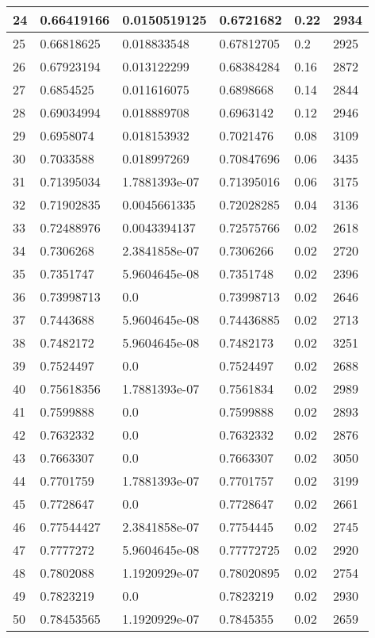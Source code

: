 \begin{longtable}{|l|l|l|l|l|l|}
24 & 0.66419166 & 0.0150519125 & 0.6721682 & 0.22 & 2934 \\ \hline 
25 & 0.66818625 & 0.018833548 & 0.67812705 & 0.2 & 2925 \\ \hline 
26 & 0.67923194 & 0.013122299 & 0.68384284 & 0.16 & 2872 \\ \hline 
27 & 0.6854525 & 0.011616075 & 0.6898668 & 0.14 & 2844 \\ \hline 
28 & 0.69034994 & 0.018889708 & 0.6963142 & 0.12 & 2946 \\ \hline 
29 & 0.6958074 & 0.018153932 & 0.7021476 & 0.08 & 3109 \\ \hline 
30 & 0.7033588 & 0.018997269 & 0.70847696 & 0.06 & 3435 \\ \hline 
31 & 0.71395034 & 1.7881393e-07 & 0.71395016 & 0.06 & 3175 \\ \hline 
32 & 0.71902835 & 0.0045661335 & 0.72028285 & 0.04 & 3136 \\ \hline 
33 & 0.72488976 & 0.0043394137 & 0.72575766 & 0.02 & 2618 \\ \hline 
34 & 0.7306268 & 2.3841858e-07 & 0.7306266 & 0.02 & 2720 \\ \hline 
35 & 0.7351747 & 5.9604645e-08 & 0.7351748 & 0.02 & 2396 \\ \hline 
36 & 0.73998713 & 0.0 & 0.73998713 & 0.02 & 2646 \\ \hline 
37 & 0.7443688 & 5.9604645e-08 & 0.74436885 & 0.02 & 2713 \\ \hline 
38 & 0.7482172 & 5.9604645e-08 & 0.7482173 & 0.02 & 3251 \\ \hline 
39 & 0.7524497 & 0.0 & 0.7524497 & 0.02 & 2688 \\ \hline 
40 & 0.75618356 & 1.7881393e-07 & 0.7561834 & 0.02 & 2989 \\ \hline 
41 & 0.7599888 & 0.0 & 0.7599888 & 0.02 & 2893 \\ \hline 
42 & 0.7632332 & 0.0 & 0.7632332 & 0.02 & 2876 \\ \hline 
43 & 0.7663307 & 0.0 & 0.7663307 & 0.02 & 3050 \\ \hline 
44 & 0.7701759 & 1.7881393e-07 & 0.7701757 & 0.02 & 3199 \\ \hline 
45 & 0.7728647 & 0.0 & 0.7728647 & 0.02 & 2661 \\ \hline 
46 & 0.77544427 & 2.3841858e-07 & 0.7754445 & 0.02 & 2745 \\ \hline 
47 & 0.7777272 & 5.9604645e-08 & 0.77772725 & 0.02 & 2920 \\ \hline 
48 & 0.7802088 & 1.1920929e-07 & 0.78020895 & 0.02 & 2754 \\ \hline 
49 & 0.7823219 & 0.0 & 0.7823219 & 0.02 & 2930 \\ \hline 
50 & 0.78453565 & 1.1920929e-07 & 0.7845355 & 0.02 & 2659 \\ \hline 
\end{longtable}